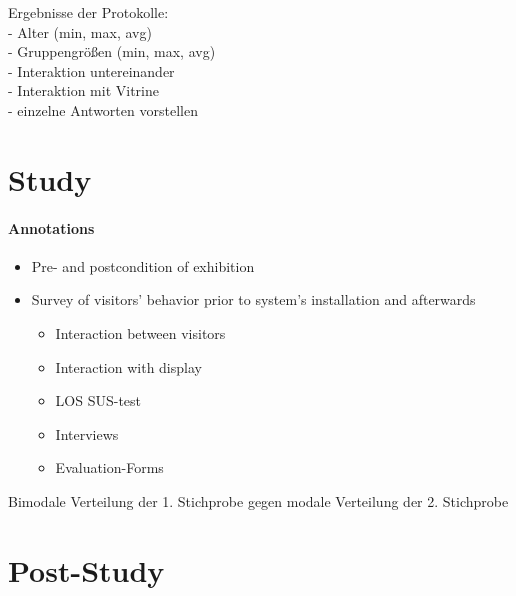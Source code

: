 Ergebnisse der Protokolle:
\\- Alter (min, max, avg)
\\- Gruppengrößen (min, max, avg)
\\- Interaktion untereinander
\\- Interaktion mit Vitrine
\\- einzelne Antworten vorstellen


\section{Study}
\label{evaluation_study}

\paragraph{Annotations}

\begin{itemize}
	\item Pre- and postcondition of exhibition
	\item Survey of visitors' behavior prior to system's installation and afterwards
	\begin{itemize}
		\item Interaction between visitors
		\item Interaction with display
		\item \ac{LOS} SUS-test
		\item Interviews
		\item Evaluation-Forms
	\end{itemize}
\end{itemize}

Bimodale Verteilung der 1. Stichprobe gegen modale Verteilung der 2. Stichprobe


\section{Post-Study}
\label{evaluation_post}
